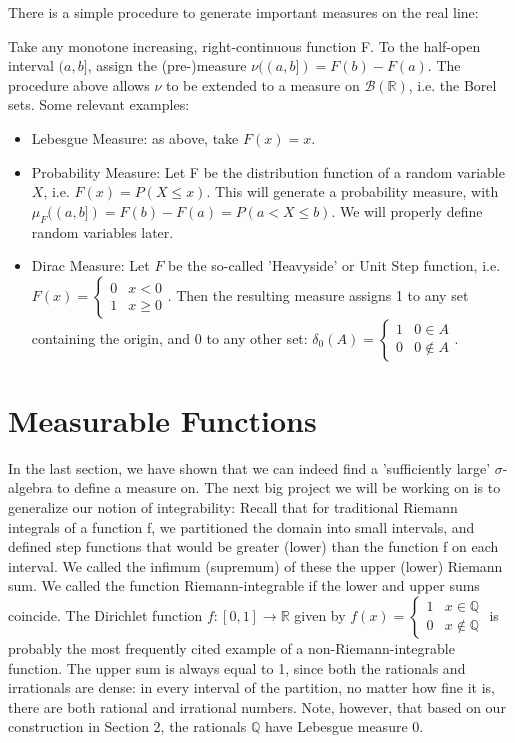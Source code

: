 \documentclass[11pt]{scrartcl}
\begin{document}
\begin{example}
There is a simple procedure to generate important measures on the real line: 

Take any monotone increasing, right-continuous function F. To the half-open interval $(a,b]$, assign the (pre-)measure $\nu((a,b]) = F(b) - F(a)$. The procedure above allows $\nu$ to be extended to a measure on $\mathcal{B}(\mathbb{R})$, i.e. the Borel sets. Some relevant examples:

\begin{itemize}
    \item Lebesgue Measure: as above, take $F(x) = x$. 
    \item Probability Measure: Let F be the distribution function of a random variable $X$, i.e. $F(x) = P(X \le x)$. This will generate a probability measure, with $\mu_F((a,b]) = F(b) - F(a) = P(a < X \le b)$. We will properly define random variables later.
    \item Dirac Measure: Let $F$ be the so-called 'Heavyside' or Unit Step function, i.e. $F(x) = \begin{cases}
0 & x < 0 \\
1 & x \ge 0 
\end{cases}$. Then the resulting measure assigns 1 to any set containing the origin, and 0 to any other set:
$\delta_0(A) = \begin{cases}
1 & 0 \in A \\
0 & 0 \notin A
\end{cases}$.
\end{itemize}


\end{example}{}





\section{Measurable Functions}
In the last section, we have shown that we can indeed find a 'sufficiently large' $\sigma$-algebra to define a measure on. 
The next big project we will be working on is to generalize our notion of integrability: Recall that for traditional Riemann integrals of a function f, we partitioned the domain into small intervals, and defined step functions that would be greater (lower) than the function f on each interval. We called the infimum (supremum) of these the upper (lower) Riemann sum. We called the function Riemann-integrable if the lower and upper sums coincide. 
The Dirichlet function $f: [0,1] \rightarrow \mathbb{R}$ given by
$f(x) = \begin{cases}
1 & x \in \mathbb{Q} \\
0 & x \notin \mathbb{Q} 
\end{cases}$ is probably the most frequently cited example of a non-Riemann-integrable function. The upper sum is always equal to 1, since both the rationals and irrationals are dense: in every interval of the partition, no matter how fine it is, there are both rational and irrational numbers.
Note, however, that based on our construction in Section 2, the rationals $\mathbb{Q}$ have Lebesgue measure 0. 
\end{document}
